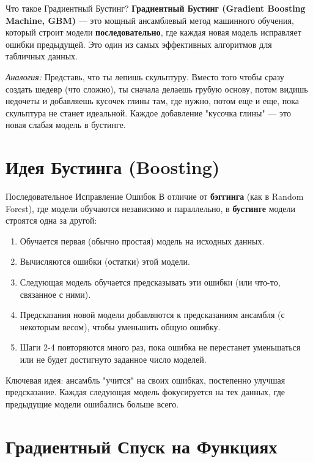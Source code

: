 
\begin{myblock}{Что такое Градиентный Бустинг?}
    \textbf{Градиентный Бустинг (Gradient Boosting Machine, GBM)} — это мощный ансамблевый метод машинного обучения, который строит модели \textbf{последовательно}, где каждая новая модель исправляет ошибки предыдущей. Это один из самых эффективных алгоритмов для табличных данных.

    \textit{Аналогия:} Представь, что ты лепишь скульптуру. Вместо того чтобы сразу создать шедевр (что сложно), ты сначала делаешь грубую основу, потом видишь недочеты и добавляешь кусочек глины там, где нужно, потом еще и еще, пока скульптура не станет идеальной. Каждое добавление "кусочка глины" — это новая слабая модель в бустинге.
\end{myblock}

\section{Идея Бустинга (Boosting)}

\begin{textbox}{Последовательное Исправление Ошибок}
    В отличие от \textbf{бэггинга} (как в Random Forest), где модели обучаются независимо и параллельно, в \textbf{бустинге} модели строятся одна за другой:
    \begin{enumerate}
        \item Обучается первая (обычно простая) модель на исходных данных.
        \item Вычисляются ошибки (остатки) этой модели.
        \item Следующая модель обучается предсказывать эти ошибки (или что-то, связанное с ними).
        \item Предсказания новой модели добавляются к предсказаниям ансамбля (с некоторым весом), чтобы уменьшить общую ошибку.
        \item Шаги 2-4 повторяются много раз, пока ошибка не перестанет уменьшаться или не будет достигнуто заданное число моделей.
    \end{enumerate}
    Ключевая идея: ансамбль "учится" на своих ошибках, постепенно улучшая предсказание. Каждая следующая модель фокусируется на тех данных, где предыдущие модели ошибались больше всего.
\end{textbox}

\section{Градиентный Спуск на Функциях}

